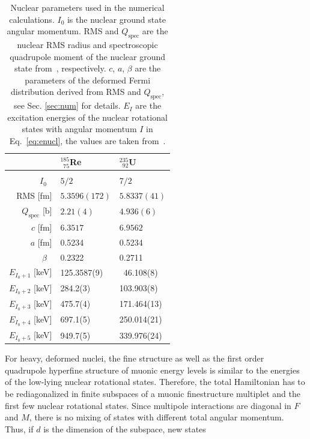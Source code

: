 \begin{table}[b]
\caption{\label{tab:params}%
Nuclear parameters used in the numerical calculations. $I_0$ is the nuclear ground state angular momentum. RMS and $Q_\text{spec}$ are the nuclear RMS radius and spectroscopic quadrupole moment of the nuclear ground state from~\cite{Angeli2013,Stone2005}, respectively. $c$, $a$, $\beta$ are the parameters of the deformed Fermi distribution derived from RMS and $Q_\text{spec}$, see Sec. \ref{sec:num} for details. $E_{I}$ are the excitation energies of the nuclear rotational states with angular momentum $I$ in Eq.~\eqref{eq:enucl}, the values are taken from~\cite{ENSDF}.}
\begin{tabular}{rll}
& $^{185}_{\phantom{1}75}$Re & $^{235}_{\phantom{1}92}$U\\ \hline \\[-10pt]
$I_0$ \hfill$\phantom{.}$ & $5/2$ & $7/2$ \\
RMS \hfill[fm] & $5.3596(172)$ & $5.8337(41)$ \\
$Q_\text{spec}$ \hfill[b] & $2.21(4)\phantom{111}$ & $4.936(6)\phantom{1}$ \\
$c$ \hfill[fm] & $6.3517$ & $6.9562$ \\
$a$ \hfill[fm] & 0.5234 & 0.5234 \\
$\beta$ \hfill$\phantom{.}$ & 0.2322 & 0.2711 \\[7pt]
$E_{I_0 + 1}$ \hfill[keV] & 125.3587(9) &  $\phantom{1}$46.108(8) \\
$E_{I_0 + 2}$ \hfill[keV] & 284.2(3) & 103.903(8) \\
$E_{I_0 + 3}$ \hfill[keV] & 475.7(4) & 171.464(13) \\
$E_{I_0 + 4}$ \hfill[keV] & 697.1(5) & 250.014(21) \\
$E_{I_0 + 5}$ \hfill[keV] & 949.7(5) & 339.976(24) \\
\end{tabular}
\end{table}
For heavy, deformed nuclei, the fine structure as well as the first order quadrupole hyperfine structure of muonic energy levels is similar to the energies of the low-lying nuclear rotational states. Therefore, the total Hamiltonian has to be rediagonalized in finite subspaces of a muonic finestructure multiplet and the first few nuclear rotational states. Since multipole interactions are diagonal in $F$ and $M$, there is no mixing of states with different total angular momentum. Thus, if $d$ is the dimension of the subspace, new states
